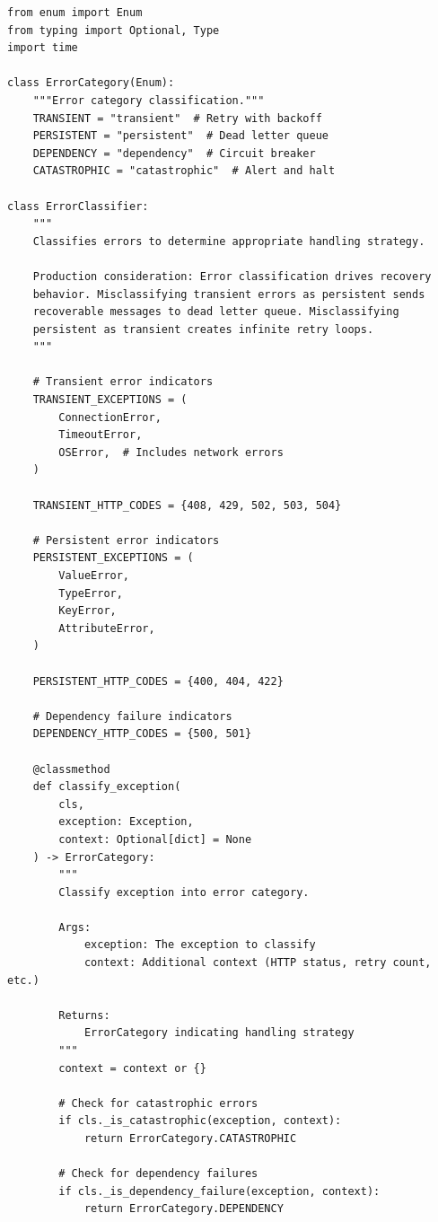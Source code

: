 \begin{lstlisting}[style=python, caption={Error Classification Logic}]
from enum import Enum
from typing import Optional, Type
import time

class ErrorCategory(Enum):
    """Error category classification."""
    TRANSIENT = "transient"  # Retry with backoff
    PERSISTENT = "persistent"  # Dead letter queue
    DEPENDENCY = "dependency"  # Circuit breaker
    CATASTROPHIC = "catastrophic"  # Alert and halt

class ErrorClassifier:
    """
    Classifies errors to determine appropriate handling strategy.

    Production consideration: Error classification drives recovery
    behavior. Misclassifying transient errors as persistent sends
    recoverable messages to dead letter queue. Misclassifying
    persistent as transient creates infinite retry loops.
    """

    # Transient error indicators
    TRANSIENT_EXCEPTIONS = (
        ConnectionError,
        TimeoutError,
        OSError,  # Includes network errors
    )

    TRANSIENT_HTTP_CODES = {408, 429, 502, 503, 504}

    # Persistent error indicators
    PERSISTENT_EXCEPTIONS = (
        ValueError,
        TypeError,
        KeyError,
        AttributeError,
    )

    PERSISTENT_HTTP_CODES = {400, 404, 422}

    # Dependency failure indicators
    DEPENDENCY_HTTP_CODES = {500, 501}

    @classmethod
    def classify_exception(
        cls,
        exception: Exception,
        context: Optional[dict] = None
    ) -> ErrorCategory:
        """
        Classify exception into error category.

        Args:
            exception: The exception to classify
            context: Additional context (HTTP status, retry count, etc.)

        Returns:
            ErrorCategory indicating handling strategy
        """
        context = context or {}

        # Check for catastrophic errors
        if cls._is_catastrophic(exception, context):
            return ErrorCategory.CATASTROPHIC

        # Check for dependency failures
        if cls._is_dependency_failure(exception, context):
            return ErrorCategory.DEPENDENCY


\end{lstlisting}
